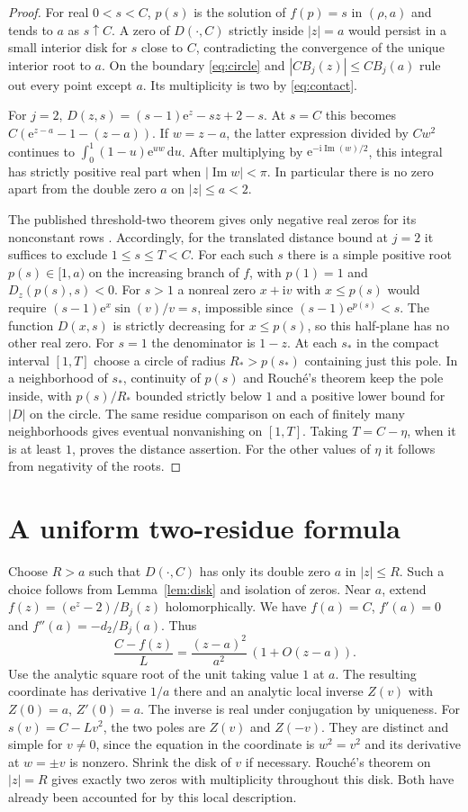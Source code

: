\documentclass[11pt]{article}
\newcommand{\ee}{\mathrm e}
\newcommand{\ii}{\mathrm i}
\newcommand{\dd}{\,\mathrm d}
\begin{document}
\begin{proof}
For real $0<s<C$, $p(s)$ is the solution of $f(p)=s$ in $(\rho,a)$
and tends to $a$ as $s\uparrow C$. A zero of $D(\cdot,C)$ strictly inside
$|z|=a$ would persist in a small interior disk for $s$ close to $C$,
contradicting the convergence of the unique interior root to $a$.
On the boundary \eqref{eq:circle} and $|C B_j(z)|\le C B_j(a)$ rule out
every point except $a$. Its multiplicity is two by \eqref{eq:contact}.

For $j=2$, $D(z,s)=(s-1)\ee^z-sz+2-s$. At $s=C$ this becomes
$C(\ee^{z-a}-1-(z-a))$. If $w=z-a$, the latter expression divided by
$Cw^2$ continues to
$\int_0^1(1-u)\ee^{uw}\dd u$. After multiplying by
$\ee^{-\ii\operatorname{Im}(w)/2}$, this integral has strictly
positive real part when $|\operatorname{Im} w|<\pi$. In particular
there is no zero apart from the double zero $a$ on $|z|\le a<2$.

The published threshold-two theorem gives only negative real zeros
for its nonconstant rows \cite{two}. Accordingly, for the translated
distance bound at $j=2$ it suffices to exclude $1\le s\le T<C$.
For each such $s$ there is a simple positive root $p(s)\in[1,a)$
on the increasing branch of $f$, with $p(1)=1$ and $D_z(p(s),s)<0$.
For $s>1$ a nonreal zero $x+\ii v$ with $x\le p(s)$ would require
$(s-1)\ee^x\sin(v)/v=s$, impossible since
$(s-1)\ee^{p(s)}<s$. The function $D(x,s)$ is strictly decreasing for
$x\le p(s)$, so this half-plane has no other real zero. For $s=1$
the denominator is $1-z$. At each $s_*$ in the compact interval
$[1,T]$ choose a circle of radius $R_*>p(s_*)$ containing just this
pole. In a neighborhood of $s_*$, continuity of $p(s)$ and
Rouch\'e's theorem keep the pole inside, with $p(s)/R_*$ bounded
strictly below $1$ and a positive lower bound for $|D|$ on the circle.
The same residue comparison on each of finitely many neighborhoods
gives eventual nonvanishing on $[1,T]$. Taking $T=C-\eta$, when it
is at least $1$, proves the distance assertion. For the other
values of $\eta$ it follows from negativity of the roots.
\end{proof}

\section{A uniform two-residue formula}

Choose $R>a$ such that $D(\cdot,C)$ has only its double zero $a$ in
$|z|\le R$. Such a choice follows from Lemma~\ref{lem:disk} and
isolation of zeros. Near $a$, extend $f(z)=(\ee^z-2)/B_j(z)$
holomorphically. We have $f(a)=C$, $f'(a)=0$ and
$f''(a)=-d_2/B_j(a)$. Thus
\[
 \frac{C-f(z)}{L} = \frac{(z-a)^2}{a^2}\,(1+O(z-a)).
\]
Use the analytic square root of the unit taking value $1$ at $a$.
The resulting coordinate has derivative $1/a$ there and an analytic
local inverse $Z(v)$ with $Z(0)=a$, $Z'(0)=a$. The inverse is real
under conjugation by uniqueness. For $s(v)=C-Lv^2$, the two poles
are $Z(v)$ and $Z(-v)$. They are distinct and simple for $v\ne0$,
since the equation in the coordinate is $w^2=v^2$ and its derivative
at $w=\pm v$ is nonzero. Shrink the disk of $v$ if necessary.
Rouch\'e's theorem on $|z|=R$ gives exactly two zeros with
multiplicity throughout this disk. Both have already been accounted
for by this local description.
\end{document}
